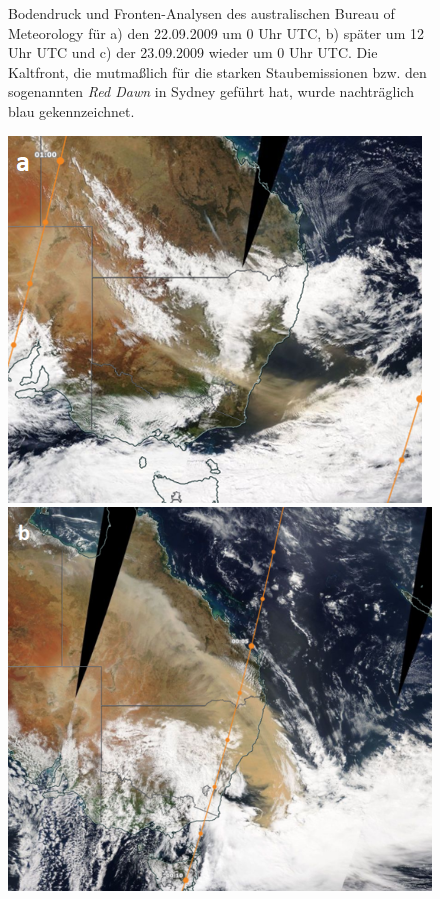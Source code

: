 \documentclass[12pt,a4paper,onecolumn]{scrartcl}
\begin{document}
\begin{figure}[ht]
\begin{minipage}[c]{0.33\textwidth}
	\end{minipage}\hfill
	\caption{Bodendruck und Fronten-Analysen des australischen Bureau of Meteorology für a) den 22.09.2009 um 0 Uhr UTC, b) später um 12 Uhr UTC und c) der 23.09.2009 wieder um 0 Uhr UTC. Die Kaltfront, die mutmaßlich für die starken Staubemissionen bzw. den sogenannten \textit{Red Dawn} in Sydney geführt hat, wurde nachträglich blau gekennzeichnet.} \label{fig:bom_analysis}
\end{figure}

\begin{figure}[ht]
	\begin{minipage}[c]{0.33\textwidth}
		\includegraphics[width=\textwidth]{bilder/reddawn/2209T01.png}
	\end{minipage}\hfill
		\begin{minipage}[c]{0.329\textwidth}
		\includegraphics[width=\textwidth]{bilder/reddawn/2309T00.png}

\end{minipage}
\end{figure}
\end{document}
